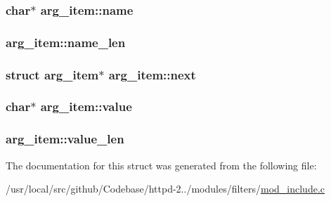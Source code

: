 \subsubsection[{\texorpdfstring{name}{name}}]{\setlength{\rightskip}{0pt plus 5cm}char$\ast$ arg\+\_\+item\+::name}\hypertarget{structarg__item_ad342f3bd7e8cf5b3068deb4c616bbb94}{}\label{structarg__item_ad342f3bd7e8cf5b3068deb4c616bbb94}
\subsubsection[{\texorpdfstring{name\+\_\+len}{name_len}}]{ arg\+\_\+item\+::name\+\_\+len}\hypertarget{structarg__item_a58ba208cec3dc2a01b2357a399202073}{}\label{structarg__item_a58ba208cec3dc2a01b2357a399202073}
\subsubsection[{\texorpdfstring{next}{next}}]{\setlength{\rightskip}{0pt plus 5cm}struct {\bf arg\+\_\+item}$\ast$ arg\+\_\+item\+::next}\hypertarget{structarg__item_a5c4faef478d2a62c97c2e4ac82e5af2c}{}\label{structarg__item_a5c4faef478d2a62c97c2e4ac82e5af2c}
\subsubsection[{\texorpdfstring{value}{value}}]{\setlength{\rightskip}{0pt plus 5cm}char$\ast$ arg\+\_\+item\+::value}\hypertarget{structarg__item_a43c9561a40f2b6441e8de2a62b06b293}{}\label{structarg__item_a43c9561a40f2b6441e8de2a62b06b293}
\subsubsection[{\texorpdfstring{value\+\_\+len}{value_len}}]{ arg\+\_\+item\+::value\+\_\+len}\hypertarget{structarg__item_a862487e974ef750e221784a8c5c4e103}{}\label{structarg__item_a862487e974ef750e221784a8c5c4e103}


The documentation for this struct was generated from the following file\+:\begin{DoxyCompactItemize}
\item 
/usr/local/src/github/\+Codebase/httpd-\/2../modules/filters/\hyperlink{mod__include_8c}{mod\+\_\+include.\+c}\end{DoxyCompactItemize}
